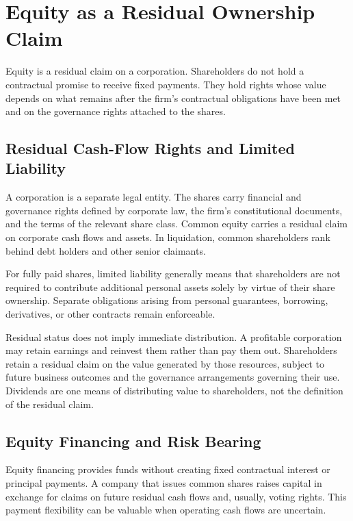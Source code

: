 \section{Equity as a Residual Ownership Claim}

Equity is a residual claim on a corporation. Shareholders do not hold a contractual promise to receive fixed payments. They hold rights whose value depends on what remains after the firm's contractual obligations have been met and on the governance rights attached to the shares.

\subsection{Residual Cash-Flow Rights and Limited Liability}

A corporation is a separate legal entity. The shares
carry financial and governance rights defined by
corporate law, the firm's constitutional documents,
and the terms of the relevant share class. Common
equity carries a residual claim on corporate cash
flows and assets. In liquidation, common shareholders
rank behind debt holders and other senior claimants.

For fully paid shares, limited liability generally
means that shareholders are not required to contribute
additional personal assets solely by virtue of their
share ownership. Separate obligations arising from
personal guarantees, borrowing, derivatives, or other
contracts remain enforceable.

Residual status does not imply immediate distribution.
A profitable corporation may retain earnings and
reinvest them rather than pay them out. Shareholders
retain a residual claim on the value generated by
those resources, subject to future business outcomes
and the governance arrangements governing their use.
Dividends are one means of distributing value to
shareholders, not the definition of the residual claim.

\subsection{Equity Financing and Risk Bearing}

Equity financing provides funds without creating fixed
contractual interest or principal payments. A company
that issues common shares raises capital in exchange
for claims on future residual cash flows and, usually,
voting rights. This payment flexibility can be valuable
when operating cash flows are uncertain.

